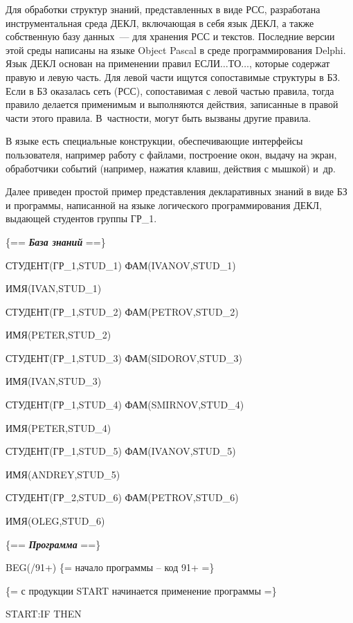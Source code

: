 \begin{multicols}{2}
 Для обработки структур знаний, представленных в виде РСС, разработана
инструментальная среда ДЕКЛ, включающая в себя язык ДЕКЛ, а также
собственную базу данных~--- для хранения РСС и текстов. Последние версии
этой среды написаны на языке Object Pascal в среде программирования Delphi.
Язык ДЕКЛ основан на применении правил ЕСЛИ$\ldots$ТО$\ldots$, которые
содержат правую и левую часть. Для левой части ищутся сопоставимые
структуры в БЗ. Если в БЗ оказалась сеть (РСС), сопоставимая с левой частью
правила, тогда правило делается применимым и выполняются действия,
записанные в правой части этого правила. В~частности, могут быть вызваны
другие правила.

 В языке есть специальные конструкции, обеспечивающие интерфейсы
пользователя, например работу с файлами, построение окон, выдачу на экран,
обработчики событий (например, нажатия клавиш, действия с мышкой) и~др.

 Далее приведен простой пример представления декларативных знаний в
виде БЗ и программы, написанной на языке логического
программирования ДЕКЛ, выдающей студентов группы ГР\_1.

\columnbreak

{\small
\noindent
 \{== {\bfseries\textit{База знаний}} ==\}

\noindent
 СТУДЕНТ(ГР\_1,STUD\_1) ФАМ(IVANOV,STUD\_1)

 ИМЯ(IVAN,STUD\_1)

\noindent
 СТУДЕНТ(ГР\_1,STUD\_2) ФАМ(PETROV,STUD\_2)

 ИМЯ(PETER,STUD\_2)

\noindent
 СТУДЕНТ(ГР\_1,STUD\_3) ФАМ(SIDOROV,STUD\_3)

 ИМЯ(IVAN,STUD\_3)

\noindent
 СТУДЕНТ(ГР\_1,STUD\_4) ФАМ(SMIRNOV,STUD\_4)

 ИМЯ(PETER,STUD\_4)

\noindent
 СТУДЕНТ(ГР\_1,STUD\_5) ФАМ(IVANOV,STUD\_5)

 ИМЯ(ANDREY,STUD\_5)

\noindent
 СТУДЕНТ(ГР\_2,STUD\_6) ФАМ(PETROV,STUD\_6)

 ИМЯ(OLEG,STUD\_6)

\noindent
 \{== {\bfseries\textit{Программа}} ==\}

\noindent
 BEG(/91+) \{= начало программы -- код 91+ =\}

\noindent
 \{= с продукции START начинается применение программы =\}

\noindent
 START:IF THEN

}
\end{multicols}
